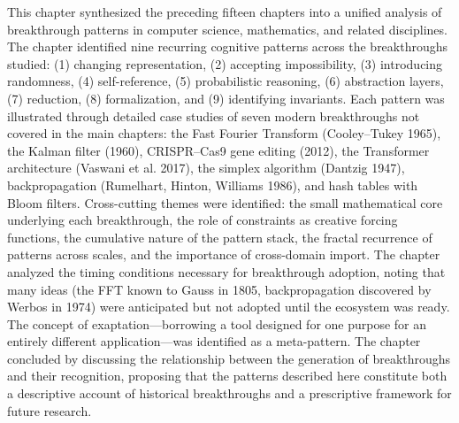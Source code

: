 This chapter synthesized the preceding fifteen chapters into a unified analysis of breakthrough patterns in computer science, mathematics, and related disciplines. The chapter identified nine recurring cognitive patterns across the breakthroughs studied: (1) changing representation, (2) accepting impossibility, (3) introducing randomness, (4) self-reference, (5) probabilistic reasoning, (6) abstraction layers, (7) reduction, (8) formalization, and (9) identifying invariants. Each pattern was illustrated through detailed case studies of seven modern breakthroughs not covered in the main chapters: the Fast Fourier Transform (Cooley--Tukey 1965), the Kalman filter (1960), CRISPR--Cas9 gene editing (2012), the Transformer architecture (Vaswani et al. 2017), the simplex algorithm (Dantzig 1947), backpropagation (Rumelhart, Hinton, Williams 1986), and hash tables with Bloom filters. Cross-cutting themes were identified: the small mathematical core underlying each breakthrough, the role of constraints as creative forcing functions, the cumulative nature of the pattern stack, the fractal recurrence of patterns across scales, and the importance of cross-domain import. The chapter analyzed the timing conditions necessary for breakthrough adoption, noting that many ideas (the FFT known to Gauss in 1805, backpropagation discovered by Werbos in 1974) were anticipated but not adopted until the ecosystem was ready. The concept of exaptation---borrowing a tool designed for one purpose for an entirely different application---was identified as a meta-pattern. The chapter concluded by discussing the relationship between the generation of breakthroughs and their recognition, proposing that the patterns described here constitute both a descriptive account of historical breakthroughs and a prescriptive framework for future research.

